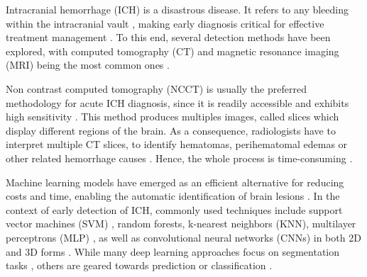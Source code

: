 % 
Intracranial hemorrhage (ICH) is a disastrous disease. It  refers to any bleeding within the intracranial vault \cite{Caceres2012}, making early diagnosis critical for effective treatment management \cite{ABRAMOVA2021101908, Thabarsa2023299}. To this end, several detection methods have been explored, with computed tomography (CT) and magnetic resonance imaging (MRI) being the most common ones \cite{Thabarsa2023299}. 




Non contrast computed tomography (NCCT) is usually the preferred methodology for acute ICH diagnosis, since it is readily accessible and exhibits high sensitivity \cite{Domingues2015}. This method produces multiples images, called slices which display different regions of the brain. As a consequence, radiologists have to interpret multiple CT slices, to identify hematomas, perihematomal edemas or other related hemorrhage causes \cite{Thabarsa2023299}. Hence, the whole process is time-consuming \cite{8363574}.


Machine learning models have emerged as an efficient alternative for reducing costs and time, enabling the automatic identification of brain lesions \cite{9332131}. In the context of early detection of ICH, commonly used techniques include support vector machines (SVM) \cite{Thabarsa2023299}, random forests, k-nearest neighbors (KNN), multilayer perceptrons (MLP) \cite{Seymour2022}, as well as convolutional neural networks (CNNs) in both 2D \cite{Zhong2021} and 3D forms \cite{10347693}. While many deep learning approaches focus on segmentation tasks \cite{ABRAMOVA2021101908, Yu2022}, others are geared towards prediction or classification \cite{Ma2022}.

